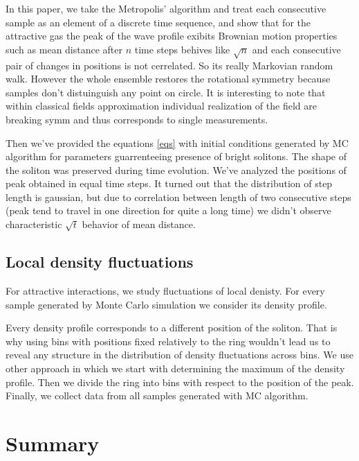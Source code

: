 \documentclass[aps,pra,reprint]{revtex4-2}
\begin{document}
    In this paper, we take the Metropolis' algorithm and treat each consecutive sample as an element of a discrete time sequence, and show that for the attractive gas the peak of the wave profile exibits Brownian motion properties such as mean distance after $n$ time steps behives like $\sqrt{n}$ and each consecutive pair of changes in positions is not cerrelated. So its really Markovian random walk. However the whole ensemble restores the rotational symmetry because samples don't distuinguish any point on circle.  
    It is interesting to note that within classical fields approximation individual realization of the field are breaking symm and thus corresponds to single measurements.
    
    Then we've provided the equations \ref{eqs} with initial conditions generated by MC algorithm for parameters guarrenteeing presence of bright solitons. The shape of the soliton was preserved during time evolution. We've analyzed the positions of peak obtained in equal time steps. It turned out that the distribution of step length is gaussian, but due to correlation between length of two consecutive steps (peak tend to travel in one direction for quite a long time) we didn't observe characteristic $\sqrt{t}$ behavior of mean distance. 
\subsection{Local density fluctuations}
    For attractive interactions, we study fluctuations of local denisty. For every sample generated by Monte Carlo simulation we consider its density profile.
    
    Every density profile corresponds to a different position of the soliton. That is why using bins with positions fixed relatively to the ring wouldn't lead us to reveal any structure in the distribution of density fluctuations across bins. We use other approach in which we start with determining the maximum of the density profile. Then we divide the ring into bins with respect to the position of the peak. Finally, we collect data from all samples generated with MC algorithm.

\section{Summary}


\end{document}
